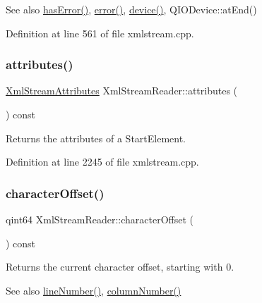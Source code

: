 \begin{DoxySeeAlso}{See also}
\hyperlink{class_xml_stream_reader_a26bc2d6831322e5a1d86182295f912d0}{has\+Error()}, \hyperlink{class_xml_stream_reader_ae9a7e8fe9f15b0f5c4ec5fa080c6249f}{error()}, \hyperlink{class_xml_stream_reader_aa2a751d1b36fac13138b2f370683dfe7}{device()}, Q\+I\+O\+Device\+::at\+End() 
\end{DoxySeeAlso}


Definition at line 561 of file xmlstream.\+cpp.

\mbox{\label{class_xml_stream_reader_aaa89a6baad93837857847a3ec5d7710a}} 
\subsubsection{\texorpdfstring{attributes()}{attributes()}}
{\footnotesize\ttfamily \hyperlink{class_xml_stream_attributes}{Xml\+Stream\+Attributes} Xml\+Stream\+Reader\+::attributes (\begin{DoxyParamCaption}{ }\end{DoxyParamCaption}) const}

Returns the attributes of a Start\+Element. 

Definition at line 2245 of file xmlstream.\+cpp.

\mbox{\label{class_xml_stream_reader_a08a187eb8969ddabf238e1f731bb754a}} 
\subsubsection{\texorpdfstring{character\+Offset()}{characterOffset()}}
{\footnotesize\ttfamily qint64 Xml\+Stream\+Reader\+::character\+Offset (\begin{DoxyParamCaption}{ }\end{DoxyParamCaption}) const}

Returns the current character offset, starting with 0.

\begin{DoxySeeAlso}{See also}
\hyperlink{class_xml_stream_reader_a74a3827867942f9904924f2004c4177e}{line\+Number()}, \hyperlink{class_xml_stream_reader_a88724d9577a835b0e8d84ed945c306df}{column\+Number()} 
\end{DoxySeeAlso}



